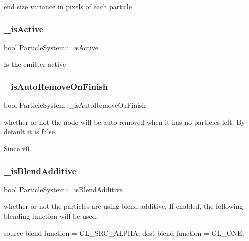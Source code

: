 end size variance in pixels of each particle \mbox{\label{classParticleSystem_a30aaa6c20c1b78d0af5cece42cdb959d}} 
\subsubsection{\texorpdfstring{\+\_\+is\+Active}{\_isActive}}
{\footnotesize\ttfamily bool Particle\+System\+::\+\_\+is\+Active\hspace{0.3cm}{\ttfamily [protected]}}

Is the emitter active \mbox{\label{classParticleSystem_af8f2c300130fcf1ba2554e7a5af0e8c9}} 
\subsubsection{\texorpdfstring{\+\_\+is\+Auto\+Remove\+On\+Finish}{\_isAutoRemoveOnFinish}}
{\footnotesize\ttfamily bool Particle\+System\+::\+\_\+is\+Auto\+Remove\+On\+Finish\hspace{0.3cm}{\ttfamily [protected]}}

whether or not the node will be auto-\/removed when it has no particles left. By default it is false. \begin{DoxySince}{Since}
v0. 
\end{DoxySince}
\mbox{\label{classParticleSystem_a620cfdfb0854ad1be32190b465e5ce0c}} 
\subsubsection{\texorpdfstring{\+\_\+is\+Blend\+Additive}{\_isBlendAdditive}}
{\footnotesize\ttfamily bool Particle\+System\+::\+\_\+is\+Blend\+Additive\hspace{0.3cm}{\ttfamily [protected]}}

whether or not the particles are using blend additive. If enabled, the following blending function will be used. 
\begin{DoxyCode}
source blend \textcolor{keyword}{function} = GL\_SRC\_ALPHA;
dest blend \textcolor{keyword}{function} = GL\_ONE;
\end{DoxyCode}
 \mbox{\label{classParticleSystem_a09edd8c33eb63de198153d32dcaa6dd3}} 
